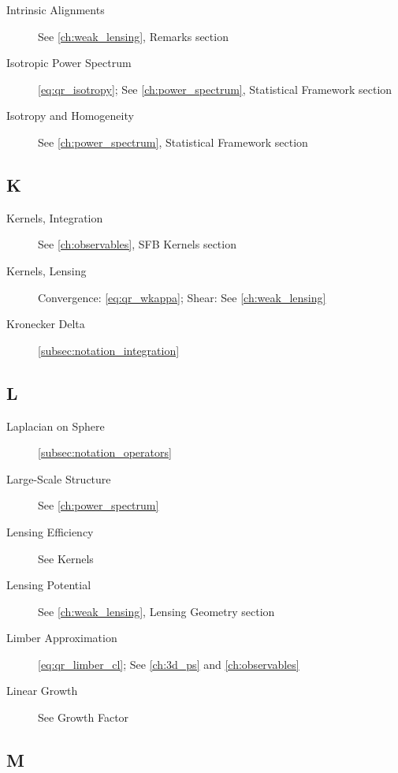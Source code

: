 \begin{description}
    \item[Intrinsic Alignments] See \cref{ch:weak_lensing}, Remarks section
    \item[Isotropic Power Spectrum] \autoref{eq:qr_isotropy}; See \cref{ch:power_spectrum}, Statistical Framework section
    \item[Isotropy and Homogeneity] See \cref{ch:power_spectrum}, Statistical Framework section
\end{description}

\subsection{K}\label{subsec:idx_k}

\begin{description}
    \item[Kernels, Integration] See \cref{ch:observables}, SFB Kernels section
    \item[Kernels, Lensing] Convergence: \autoref{eq:qr_wkappa}; Shear: See \cref{ch:weak_lensing}
    \item[Kronecker Delta] \autoref{subsec:notation_integration}
\end{description}

\subsection{L}\label{subsec:idx_l}

\begin{description}
    \item[Laplacian on Sphere] \autoref{subsec:notation_operators}
    \item[Large-Scale Structure] See \cref{ch:power_spectrum}
    \item[Lensing Efficiency] See Kernels
    \item[Lensing Potential] See \cref{ch:weak_lensing}, Lensing Geometry section
    \item[Limber Approximation] \autoref{eq:qr_limber_cl}; See \cref{ch:3d_ps} and \cref{ch:observables}
    \item[Linear Growth] See Growth Factor
\end{description}

\subsection{M}\label{subsec:idx_m}

